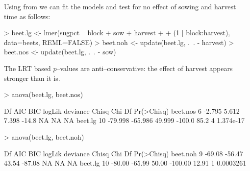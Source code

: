 \begin{sframe}

Using  from  we can
fit the models and test for no effect of sowing and harvest time as follows:


\begin{Schunk}
\begin{Sinput}
> beet.lg <- lmer(sugpct ~ block + sow + harvest + 
+                       (1 | block:harvest), data=beets, REML=FALSE)
> beet.noh <- update(beet.lg, .~. - harvest)
> beet.nos  <- update(beet.lg, .~. - sow)
\end{Sinput}
\end{Schunk}

\end{sframe}

\begin{sff}

The LRT based $p$--values are anti--conservative: the effect
of harvest appears stronger than it is.
\begin{Schunk}
\begin{Sinput}
> anova(beet.lg, beet.nos)  %
\end{Sinput}
\begin{Soutput}
         Df     AIC     BIC logLik deviance Chisq Chi Df Pr(>Chisq)
beet.nos  6  -2.795   5.612  7.398    -14.8    NA     NA         NA
beet.lg  10 -79.998 -65.986 49.999   -100.0  85.2      4  1.374e-17
\end{Soutput}
\begin{Sinput}
> anova(beet.lg, beet.noh)  %
\end{Sinput}
\begin{Soutput}
         Df    AIC    BIC logLik deviance Chisq Chi Df Pr(>Chisq)
beet.noh  9 -69.08 -56.47  43.54   -87.08    NA     NA         NA
beet.lg  10 -80.00 -65.99  50.00  -100.00 12.91      1  0.0003261
\end{Soutput}
\end{Schunk}
  
\end{sff}


